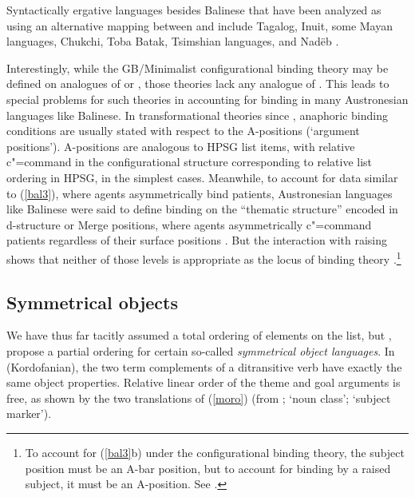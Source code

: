 \documentclass[output=paper
	        ,collection
	        ,collectionchapter
 	        ,biblatex
                ,babelshorthands
                ,newtxmath
                ,draftmode
                ,colorlinks, citecolor=brown
]{langscibook}
\begin{document}
Syntactically ergative languages besides Balinese that have been analyzed as using an alternative mapping between \argst and \val include Tagalog, Inuit, some Mayan languages, Chukchi, Toba Batak, Tsimshian languages, and Nad{\"e}b \citep{Manning1996,Manning+Sag:1999}.  

Interestingly, while the GB/Minimalist configurational binding theory may be defined on analogues of \val or \content,  those theories lack any analogue of \argst.  This leads to special problems for such theories in accounting for binding in many Austronesian languages like Balinese.  In transformational theories since \citet{Chomsky:1981}, anaphoric binding conditions are usually stated with respect to the A-positions (`argument positions').  A-positions are analogous to HPSG \val list items, with relative c"=command in the configurational structure corresponding to relative list ordering in HPSG, in the simplest cases.  Meanwhile, to account for data similar to (\ref{bal3}), where agents asymmetrically bind patients, Austronesian languages like Balinese were said to define binding on the ``thematic structure'' encoded in d-structure or Merge positions, where agents asymmetrically c"=command patients regardless of their surface positions \citep{Guilfoyle+etal:1992}.  But the interaction with raising shows that neither of those levels is appropriate as the locus of binding theory \citep{Wechsler1999}.\footnote{To account for (\ref{bal3}b) under the configurational binding theory, the subject position must be an A-bar position, but to account for binding by a raised subject, it must be an A-position.  See \citet{Wechsler1999}. } 



\subsection{Symmetrical objects}
We have thus far tacitly assumed a total ordering of elements on the \argst list, but \citet{AMM2013a}, \citet{Ackermanetal2017} propose a partial ordering
 for certain so-called \emph{symmetrical object languages}.  In  (Kordofanian), the two term complements of a ditransitive  verb have exactly the same object properties.  Relative linear order of the theme and goal arguments is free, as shown by the two translations of (\ref{moro}) (from \citealt[9]{Ackermanetal2017};  `noun class';  `subject marker').
\end{document}
